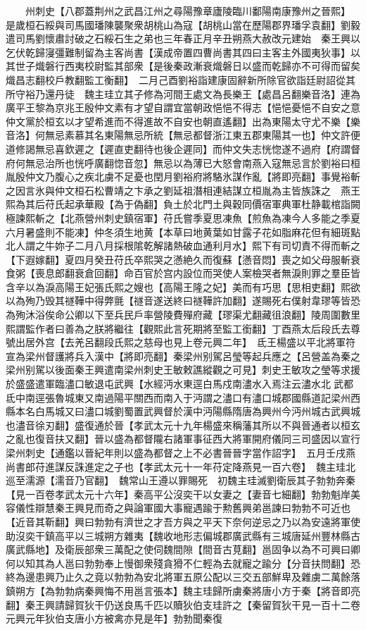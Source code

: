 　　州刺史【八郡蓋荆州之武昌江州之尋陽豫章廬陵臨川鄱陽南康豫州之晉熙】　是歲桓石綏與司馬國璠陳襲聚衆胡桃山為寇【胡桃山當在歷陽郡界璠孚袁翻】劉毅遣司馬劉懷肅討破之石綏石生之弟也三年春正月辛丑朔燕大赦改元建始　秦王興以乞伏乾歸寖彊難制留為主客尚書【漢成帝置四曹尚書其四曰主客主外國夷狄事】以其世子熾磐行西夷校尉監其部衆【是後秦政漸衰熾磐日以盛而乾歸亦不可得而留矣熾昌志翻校戶教翻監工衡翻】　二月己酉劉裕詣建康固辭新所除官欲詣廷尉詔從其所守裕乃還丹徒　魏主珪立其子修為河間王處文為長樂王【處昌呂翻樂音洛】連為廣平王黎為京兆王殷仲文素有才望自謂宜當朝政悒悒不得志【悒悒憂悒不自安之意仲文黨於桓玄以才望希進而不得進故不自安也朝直遙翻】出為東陽太守尤不樂【樂音洛】何無忌素慕其名東陽無忌所統【無忌都督浙江東五郡東陽其一也】仲文許便道修謁無忌喜欽遲之【遲直吏翻待也後企遲同】而仲文失志恍惚遂不過府【府謂督府何無忌治所也恍呼廣翻惚音忽】無忌以為薄已大怒會南燕入寇無忌言於劉裕曰桓胤殷仲文乃腹心之疾北虜不足憂也閏月劉裕府將駱氷謀作亂【將即亮翻】事覺裕斬之因言氷與仲文桓石松曹靖之卞承之劉延祖潛相連結謀立桓胤為主皆族誅之　燕王熙為其后苻氏起承華殿【為于偽翻】負土於北門土與穀同價宿軍典軍杜静載棺詣闕極諫熙斬之【北燕營州刺史鎮宿軍】苻氏嘗季夏思凍魚【煎魚為凍今人多能之季夏六月暑盛則不能凍】仲冬須生地黄【本草曰地黄葉如甘露子花如脂麻花但有細斑點北人謂之牛妳子二月八月採根隂乾解諸熱破血通利月水】熙下有司切責不得而斬之【下遐嫁翻】夏四月癸丑苻氏卒熙哭之懣絶久而復蘇【懣音悶】喪之如父母服斬衰食粥【喪息郎翻衰倉回翻】命百官於宫内設位而哭使人案檢哭者無淚則罪之羣臣皆含辛以為淚高陽王妃張氏熙之嫂也【高陽王隆之妃】美而有巧思【思相吏翻】熙欲以為殉乃毁其禭鞾中得弊氈【禭音遂送終曰禭鞾許加翻】遂賜死右僕射韋璆等皆恐為殉沐浴俟命公卿以下至兵民戶率營陵費殫府藏【璆渠尤翻藏徂浪翻】陵周圍數里熙謂監作者曰善為之朕將繼往【觀熙此言死期將至監工銜翻】丁酉燕太后段氏去尊號出居外宫【去羌呂翻段氏熙之慈母也見上卷元興二年】　氐王楊盛以平北將軍符宣為梁州督護將兵入漢中【將即亮翻】秦梁州别駕呂瑩等起兵應之【呂營盖為秦之梁州别駕以後面秦王興遣南梁州刺史王敏敕譙縱觀之可見】刺史王敏攻之瑩等求援於盛盛遣軍臨濜口敏退屯武興【水經沔水東逕白馬戍南濜水入焉注云濜水北武都氐中南逕張魯城東又南過陽平關西而南入于沔謂之濜口有濜口城郡國縣道記梁州西縣本名白馬城又曰濜口城劉蜀置武興督於漢中沔陽縣隋唐為興州今沔州城古武興城也濜音徐刃翻】盛復通於晉【孝武太元十九年楊盛來稱藩其所以不與晉通者以桓玄之亂也復音扶又翻】晉以盛為都督隴右諸軍事征西大將軍開府儀同三司盛因以宣行梁州刺史【通鑑以晉紀年則以盛為都督之上不必書晉晉字當作詔字】　五月壬戌燕尚書郎苻進謀反誅進定之子也【孝武太元十一年苻定降燕見一百六卷】　魏主珪北巡至濡源【濡音乃官翻】　魏常山王遵以罪賜死　初魏主珪滅劉衛辰其子勃勃奔秦【見一百卷孝武太元十六年】秦高平公沒奕干以女妻之【妻音七細翻】勃勃魁岸美容儀性辯慧秦王興見而奇之與論軍國大事寵遇踰于勲舊興弟邕諫曰勃勃不可近也【近音其靳翻】興曰勃勃有濟世之才吾方與之平天下奈何逆忌之乃以為安遠將軍使助沒奕干鎮高平以三城朔方雜夷【魏收地形志偏城郡廣武縣有三城唐延州豐林縣古廣武縣地】及衛辰部衆三萬配之使伺魏間隙【間音古莧翻】邕固争以為不可興曰卿何以知其為人邕曰勃勃奉上慢御衆殘貪猾不仁輕為去就寵之踰分【分音扶問翻】恐終為邊患興乃止久之竟以勃勃為安北將軍五原公配以三交五部鮮卑及雜虜二萬餘落鎮朔方【為勃勃病秦興悔不用邕言張本】魏主珪歸所虜秦將唐小方于秦【將音即亮翻】秦王興請歸賀狄干仍送良馬千匹以贖狄伯支珪許之【秦留賀狄干見一百十二卷元興元年狄伯支唐小方被禽亦見是年】勃勃聞秦復